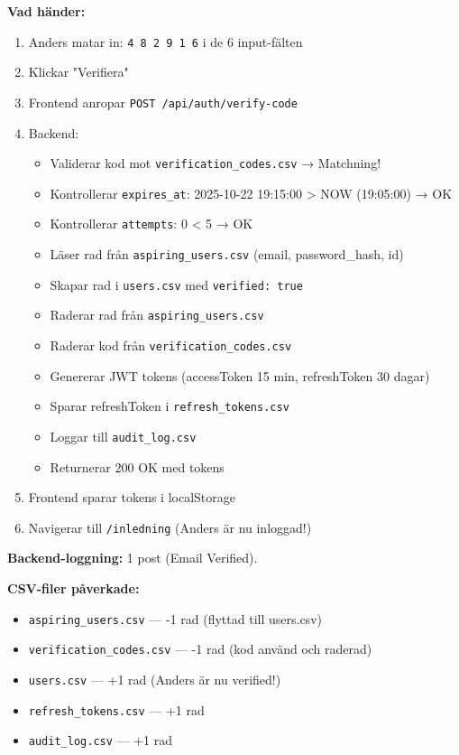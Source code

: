 \documentclass[12pt,a4paper]{article}
\begin{document}
\textbf{Vad händer:}
\begin{enumerate}[noitemsep]
  \item Anders matar in: \texttt{4 8 2 9 1 6} i de 6 input-fälten
  \item Klickar "Verifiera"
  \item Frontend anropar \texttt{POST /api/auth/verify-code}
  \item Backend:
  \begin{itemize}[noitemsep]
    \item Validerar kod mot \texttt{verification\_codes.csv} → Matchning!
    \item Kontrollerar \texttt{expires\_at}: 2025-10-22 19:15:00 > NOW (19:05:00) → OK
    \item Kontrollerar \texttt{attempts}: 0 < 5 → OK
    \item Läser rad från \texttt{aspiring\_users.csv} (email, password\_hash, id)
    \item Skapar rad i \texttt{users.csv} med \texttt{verified: true}
    \item Raderar rad från \texttt{aspiring\_users.csv}
    \item Raderar kod från \texttt{verification\_codes.csv}
    \item Genererar JWT tokens (accessToken 15 min, refreshToken 30 dagar)
    \item Sparar refreshToken i \texttt{refresh\_tokens.csv}
    \item Loggar till \texttt{audit\_log.csv}
    \item Returnerar 200 OK med tokens
  \end{itemize}
  \item Frontend sparar tokens i localStorage
  \item Navigerar till \texttt{/inledning} (Anders är nu inloggad!)
\end{enumerate}

\textbf{Backend-loggning:} 1 post (Email Verified).

\textbf{CSV-filer påverkade:}
\begin{itemize}[noitemsep]
  \item \texttt{aspiring\_users.csv} — -1 rad (flyttad till users.csv)
  \item \texttt{verification\_codes.csv} — -1 rad (kod använd och raderad)
  \item \texttt{users.csv} — +1 rad (Anders är nu verified!)
  \item \texttt{refresh\_tokens.csv} — +1 rad
  \item \texttt{audit\_log.csv} — +1 rad
\end{itemize}
\end{document}
